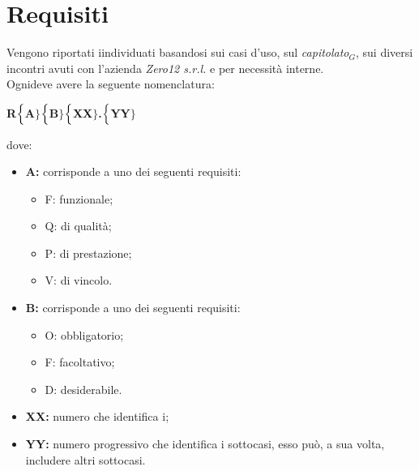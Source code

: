 \chapter{Requisiti} \label{Requisiti}
Vengono riportati iindividuati basandosi sui casi d'uso, sul \textit{capitolato$_{G}$}, sui diversi incontri avuti con l'azienda \textit{Zero12 s.r.l.} e per necessità interne. \\

Ognideve avere la seguente nomenclatura:
\begin{center}
	\textbf{R$\Bigl\{$A$\Bigr\}$$\Bigl\{$B$\Bigr\}$$\Bigl\{$XX$\Bigr\}$.$\Bigl\{$YY$\Bigr\}$}
\end{center}
dove:
\begin{itemize}
	\item \textbf{A:} corrisponde a uno dei seguenti requisiti:
	\begin{itemize}
		\item F: funzionale;
		\item Q: di qualità;
		\item P: di prestazione;
		\item V: di vincolo.
	\end{itemize}
	\item \textbf{B:} corrisponde a uno dei seguenti requisiti:
	\begin{itemize}
		\item O: obbligatorio;
		\item F: facoltativo;
		\item D: desiderabile.
	\end{itemize}
	\item \textbf{{XX}:} numero che identifica i;
	\item \textbf{{YY}:} numero progressivo che identifica i sottocasi, esso può, a sua volta, includere altri sottocasi.
\end{itemize}
\pagebreak



